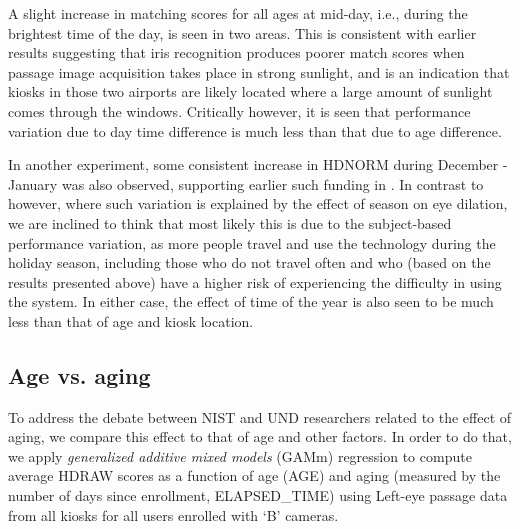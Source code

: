 \documentclass{cta-author}%
\begin{document}
A  slight  increase in matching scores for all ages at mid-day, i.e., during the brightest time of the day, is seen in two areas. 
This is consistent with earlier results suggesting that iris recognition produces poorer match scores when passage image acquisition takes place in strong sunlight, 
and is an indication that kiosks in those two airports are likely located where a large amount of sunlight comes through the windows.
Critically however, it is seen that  performance variation due to day time difference is much less than that due to age difference.

In another experiment, some consistent increase in HDNORM during December - January was also observed,  supporting  earlier such funding in \cite{Bowyer-BTAS2016}. 
In contrast to \cite{Bowyer-BTAS2016} however, where such variation is explained by the effect of season on eye dilation, 
we are inclined to think that   most likely this is due to the subject-based performance variation, 
as more people travel and use the technology during the holiday season, including those who do not travel often and who (based on the results presented above) have a higher risk of experiencing the difficulty in using the system.  
In either case, the effect of  time of the year is also seen to be much less than that of age  and kiosk location.

\subsection{Age vs. aging}

To address the debate between NIST and UND researchers related to the effect of aging, 
we compare this effect to that of age and other factors.
In order to do that, we apply 
{\it generalized additive mixed models} (GAMm) regression \cite{R-GAM}
to compute average HDRAW scores as a function of age (AGE) and aging (measured by the number of days since enrollment, ELAPSED\_TIME)
using  Left-eye passage data from all kiosks for all users enrolled with `B' cameras.
\end{document}
